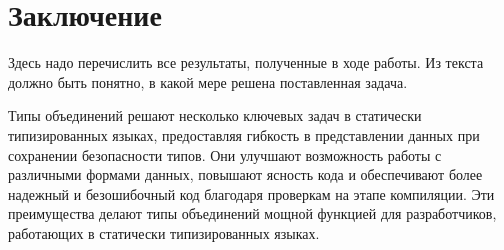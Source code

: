 \section{Заключение}
\label{sec:Chapter5} 

Здесь надо перечислить все результаты, полученные в ходе работы. Из текста
должно быть понятно, в какой мере решена поставленная задача.

Типы объединений решают несколько ключевых задач в статически типизированных языках, предоставляя гибкость
в представлении данных при сохранении безопасности типов.
Они улучшают возможность работы с различными формами данных, повышают ясность кода и обеспечивают более надежный и
безошибочный код благодаря проверкам на этапе компиляции.
Эти преимущества делают типы объединений мощной функцией для разработчиков, работающих в статически типизированных языках.

\newpage
